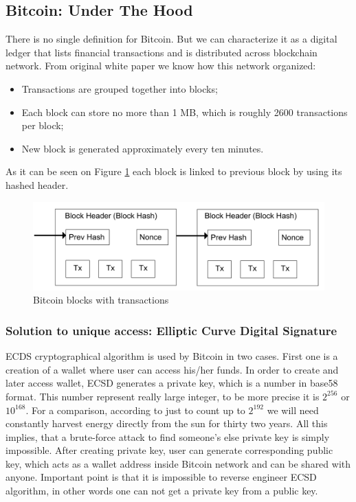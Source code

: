 \documentclass[conference,compsoc]{IEEEtran}
\begin{document}
\subsection{Bitcoin: Under The Hood}
There is no single definition for Bitcoin.
But we can characterize it as a digital ledger that lists financial transactions and is distributed across blockchain network. 
From original white paper \cite{whitepaper} we know how this network organized: 

\begin{itemize}
  \item Transactions are grouped together into blocks; 
  \item Each block can store no more than 1 MB, which is roughly 2600 transactions per block;
  \item New block is generated approximately every ten minutes.
\end{itemize}

As it can be seen on Figure \ref{fig:fig1} each block is linked to previous block by using its hashed header. 

\begin{figure}[h!]
  \centering
  \includegraphics[width=.45\textwidth]{graphics/blocks.png}
  \caption{Bitcoin blocks with transactions}
  \label{fig:fig1}
\end{figure}


\subsubsection{Solution to unique access: Elliptic Curve Digital Signature}
ECDS cryptographical algorithm is used by Bitcoin in two cases. 
First one is a creation of a wallet where user can access his/her funds.
In order to create and later access wallet, ECSD generates a private key, which is a number in base58 format. This number represent really large integer, to be more precise it is $2^{256}$ or $10^{168}$. 
For a comparison, according to \cite{cryptography} just to count up to $2^{192}$ we will need constantly harvest energy directly from the sun for thirty two years. 
All this implies, that a brute-force attack to find someone's else private key is simply impossible. 
After creating private key, user can generate corresponding public key, which acts as a wallet address inside Bitcoin network and can be shared with anyone. 
Important point is that it is impossible to reverse engineer ECSD algorithm, in other words one can not get a private key from a public key.
\end{document}
